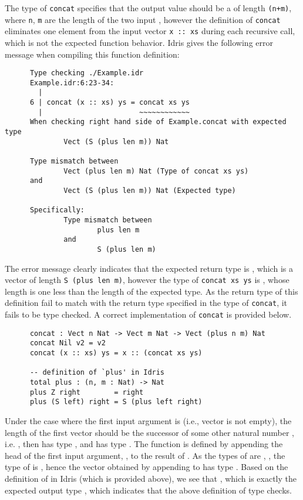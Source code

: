 The type of \texttt{concat} specifies that the output value should be a  of length \texttt{(n+m)}, where \texttt{n}, \texttt{m} are the length of the two input , however the definition of \texttt{concat} eliminates one element from the input vector \texttt{x :: xs} during each recursive call, which is not the expected function behavior. Idris gives the following error message when compiling this function definition: 
\begin{lstlisting}
      Type checking ./Example.idr
      Example.idr:6:23-34:
        |
      6 | concat (x :: xs) ys = concat xs ys
        |                       ~~~~~~~~~~~~
      When checking right hand side of Example.concat with expected type
              Vect (S (plus len m)) Nat

      Type mismatch between
              Vect (plus len m) Nat (Type of concat xs ys)
      and
              Vect (S (plus len m)) Nat (Expected type)

      Specifically:
              Type mismatch between
                      plus len m
              and
                      S (plus len m)
\end{lstlisting}

The error message clearly indicates that the expected return type is , which is a vector of length \texttt{S (plus len m)}, however the type of \texttt{concat xs ys} is , whose length is one less than the length of the expected type. As the return type of this definition fail to match with the return type specified in the type of \texttt{concat}, it fails to be type checked. A correct implementation of \texttt{concat} is provided below. 
\begin{lstlisting}
      concat : Vect n Nat -> Vect m Nat -> Vect (plus n m) Nat
      concat Nil v2 = v2
      concat (x :: xs) ys = x :: (concat xs ys)

      -- definition of `plus' in Idris
      total plus : (n, m : Nat) -> Nat
      plus Z right        = right
      plus (S left) right = S (plus left right)
 \end{lstlisting}

Under the case where the first input argument is  (i.e., vector is not empty), the length of the first vector  should be the successor of some other natural number , i.e. , then  has type , and  has type . The  function is defined by appending the head of the first input argument, , to the result of . As the types of  are , , the type of  is , hence the vector obtained by appending  to  has type . Based on the definition of  in Idris (which is provided above), we see that , which is exactly the expected output type , which indicates that the above definition of  type checks. 
\\

